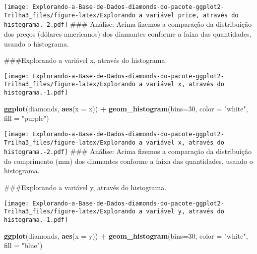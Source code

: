 \documentclass[
]{article}
\newenvironment{Shaded}{\begin{snugshade}}{\end{snugshade}}
\newcommand{\DataTypeTok}[1]{\textcolor[rgb]{0.13,0.29,0.53}{#1}}
\newcommand{\DecValTok}[1]{\textcolor[rgb]{0.00,0.00,0.81}{#1}}
\newcommand{\KeywordTok}[1]{\textcolor[rgb]{0.13,0.29,0.53}{\textbf{#1}}}
\newcommand{\NormalTok}[1]{#1}
\newcommand{\OperatorTok}[1]{\textcolor[rgb]{0.81,0.36,0.00}{\textbf{#1}}}
\newcommand{\StringTok}[1]{\textcolor[rgb]{0.31,0.60,0.02}{#1}}
\begin{document}
\texttt{[image: Explorando-a-Base-de-Dados-diamonds-do-pacote-ggplot2-Trilha3\_files/figure-latex/Explorando a variável price, através do histograma.-2.pdf]}
\#\#\# Análise: Acima fizemos a comparação da distribuição dos preços
(dólares americanos) dos diamantes conforme a faixa das quantidades,
usando o histograma.

\#\#\#Explorando a variável x, através do histograma.

\begin{Shaded}
\end{Shaded}

\texttt{[image: Explorando-a-Base-de-Dados-diamonds-do-pacote-ggplot2-Trilha3\_files/figure-latex/Explorando a variável x, através do histograma.-1.pdf]}

\begin{Shaded}
\begin{Highlighting}[]
\KeywordTok{ggplot}\NormalTok{(diamonds, }\KeywordTok{aes}\NormalTok{(}\DataTypeTok{x =}\NormalTok{ x)) }\OperatorTok{+}\StringTok{ }\KeywordTok{geom_histogram}\NormalTok{(}\DataTypeTok{bins=}\DecValTok{30}\NormalTok{, }\DataTypeTok{color =} \StringTok{"white"}\NormalTok{, }\DataTypeTok{fill =} \StringTok{"purple"}\NormalTok{)}
\end{Highlighting}
\end{Shaded}

\texttt{[image: Explorando-a-Base-de-Dados-diamonds-do-pacote-ggplot2-Trilha3\_files/figure-latex/Explorando a variável x, através do histograma.-2.pdf]}
\#\#\# Análise: Acima fizemos a comparação da distribuição do
comprimento (mm) dos diamantes conforme a faixa das quantidades, usando
o histograma.

\#\#\#Explorando a variável y, através do histograma.

\begin{Shaded}
\end{Shaded}

\texttt{[image: Explorando-a-Base-de-Dados-diamonds-do-pacote-ggplot2-Trilha3\_files/figure-latex/Explorando a variável y, através do histograma.-1.pdf]}

\begin{Shaded}
\begin{Highlighting}[]
\KeywordTok{ggplot}\NormalTok{(diamonds, }\KeywordTok{aes}\NormalTok{(}\DataTypeTok{x =}\NormalTok{ y)) }\OperatorTok{+}\StringTok{ }\KeywordTok{geom_histogram}\NormalTok{(}\DataTypeTok{bins=}\DecValTok{30}\NormalTok{, }\DataTypeTok{color =} \StringTok{"white"}\NormalTok{, }\DataTypeTok{fill =} \StringTok{"blue"}\NormalTok{)}
\end{Highlighting}
\end{Shaded}
\end{document}
